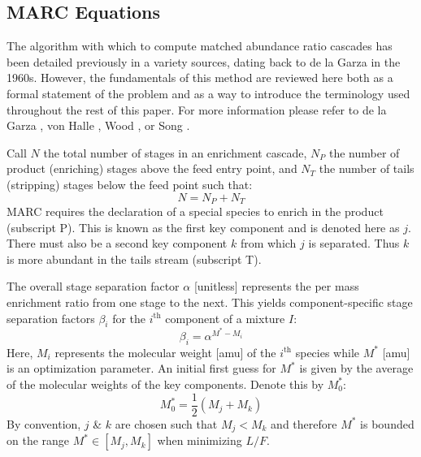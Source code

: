\documentclass[preprint,12pt]{elsarticle}
\newcommand{\ith}[0]{$i^{\mbox{th}}$ }
\begin{document}
\subsection{MARC Equations}
\label{sec:marceq}
The algorithm with which to compute matched abundance ratio cascades has been 
detailed previously in a variety sources, dating back to de la Garza in the
1960s. However, the fundamentals of this method are reviewed here both as a formal
statement of the problem and as a way to introduce the terminology used throughout 
the rest of this paper.  For more information please refer to de la Garza
\cite{DelaGarza1969}, von Halle \cite{VonHalle1987}, Wood \cite{Wood1999}, or 
Song \cite{doi:10.1080/01496391003793884}.

Call $N$ the total number of stages in an enrichment cascade, $N_P$ the number of 
product (enriching) stages above the feed entry point, and $N_T$ the number of tails
(stripping) stages below the feed point such that:
\begin{equation}
N = N_P + N_T
\end{equation}
MARC requires the declaration of a special species to enrich in the 
product (subscript P).  This is known as the first key component and is denoted 
here as $j$.  There must also be a second key component $k$ from which $j$ is 
separated. Thus $k$ is more abundant in the tails stream (subscript T).

The overall stage separation factor $\alpha$ [unitless] represents the per mass 
enrichment ratio from one stage to the next.  This yields component-specific
stage separation factors $\beta_i$ for the \ith component of a mixture $I$:
\begin{equation}
\beta_i = \alpha^{M^* - M_i}
\label{beta_i}
\end{equation}
Here, $M_i$ represents the molecular weight [amu] of the \ith
species while $M^*$ [amu] is an optimization parameter.  An initial first guess for 
$M^*$ is given by the average of the molecular weights of the key components. 
Denote this by $M_0^*$:
\begin{equation}
M_0^* = \frac{1}{2}\left(M_j + M_k\right)
\label{mstar-guess}
\end{equation}
By convention, $j$ \& $k$ are chosen such that $M_j < M_k$ and 
therefore $M^*$ is bounded on the range $M^*\in[M_j,M_k]$ when minimizing $L/F$.
\end{document}
